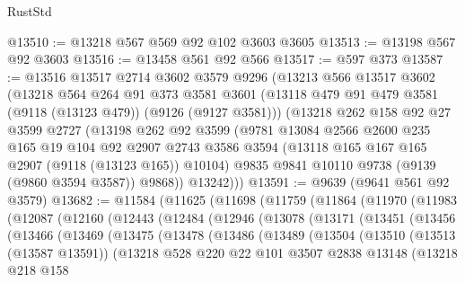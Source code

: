 \begin{lexlean}{RustStd}
\begin{coremodule}
@13510 := @13218 @567 @569 @92 @102 @3603 @3605
@13513 := @13198 @567 @92 @3603
@13516 := @13458 @561 @92 @566
@13517 := @597 @373
@13587 := @13516
    @13517
    @2714
    @3602
    @3579
    @9296
    (@13213
      @566
      @13517
      @3602
      (@13218
        @564
        @264
        @91
        @373
        @3581
        @3601
        (@13118 @479 @91 @479 @3581 (@9118 (@13123 @479)) (@9126 (@9127 @3581)))
        (@13218
          @262
          @158
          @92
          @27
          @3599
          @2727
          (@13198
            @262
            @92
            @3599
            (@9781
              @13084
              @2566
              @2600
              @235
              @165
              @19
              @104
              @92
              @2907
              @2743
              @3586
              @3594
              (@13118 @165 @167 @165 @2907 (@9118 (@13123 @165)) @10104)
              @9835
              @9841
              @10110
              @9738
              (@9139 (@9860 @3594 @3587))
              @9868))
          @13242)))
@13591 := @9639 (@9641 @561 @92 @3579)
@13682 := @11584
    (@11625
      (@11698
        (@11759
          (@11864
            (@11970
              (@11983
                (@12087
                  (@12160
                    (@12443
                      (@12484
                        (@12946
                          (@13078
                            (@13171
                              (@13451
                                (@13456
                                  (@13466
                                    (@13469
                                      (@13475
                                        (@13478
                                          (@13486
                                            (@13489
                                              (@13504
                                                (@13510
                                                  (@13513 (@13587 @13591))
                                                  (@13218
                                                    @528
                                                    @220
                                                    @22
                                                    @101
                                                    @3507
                                                    @2838
                                                    @13148
                                                    (@13218
                                                      @218
                                                      @158

\end{coremodule}
\end{lexlean}
